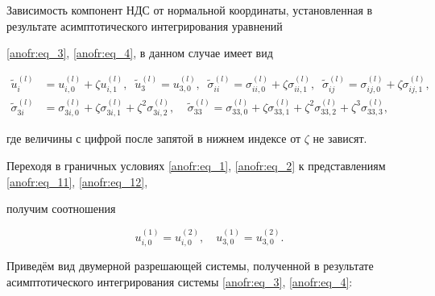 Зависимость компонент НДС от нормальной координаты, установленная в результате асимптотического интегрирования уравнений

\eqref{anofr:eq_3}, \eqref{anofr:eq_4}, в данном случае имеет вид

\begin{equation}

\label{anofr:eq_12}

\begin{aligned}

\tilde{u}_i^{(l)} &=u_{i,0}^{(l)} +\zeta u_{i,1}^{(l)} ,\; \; \tilde{u}_3^{(l)} =u_{3,0}^{(l)} ,\; \; \tilde{\sigma }_{ii}^{(l)} =

\sigma _{ii,0}^{(l)} +\zeta \sigma _{ii,1}^{(l)} ,\; \; \tilde{\sigma }_{ij}^{(l)} =\sigma _{ij,0}^{(l)} +\zeta \sigma _{ij,1}^{(l)}, \\

\tilde{\sigma }_{3i}^{(l)} &=\sigma _{3i,0}^{(l)} +\zeta \sigma _{3i,1}^{(l)} +\zeta ^2 \sigma _{3i,2}^{(l)} ,\; \; \; \;

\tilde{\sigma }_{33}^{(l)} =\sigma _{33,0}^{(l)} +\zeta \sigma _{33,1}^{(l)} +\zeta ^2 \sigma _{33,2}^{(l)} +\zeta^3 \sigma _{33,3}^{(l)},

\end{aligned}

\end{equation}

где величины с цифрой после запятой в нижнем индексе от $\zeta$ не зависят.



Переходя в граничных условиях \eqref{anofr:eq_1}, \eqref{anofr:eq_2} к представлениям \eqref{anofr:eq_11}, \eqref{anofr:eq_12},

получим соотношения

\begin{equation*}

u_{i,0}^{(1)} =u_{i,0}^{(2)},\quad  u_{3,0}^{(1)} =u_{3,0}^{(2)}.

\end{equation*}



Приведём вид двумерной разрешающей системы, полученной в результате асимптотического интегрирования системы \eqref{anofr:eq_3}, \eqref{anofr:eq_4}:

